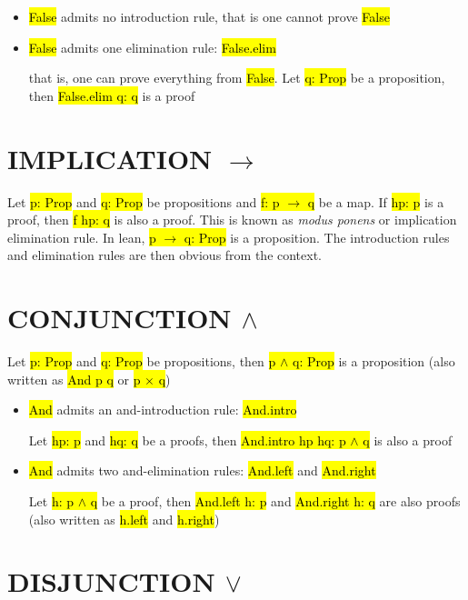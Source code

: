 \begin{itemize}
	\item \hl{False} admits no introduction rule, that is one cannot prove \hl{False}
	
	\item \hl{False} admits one elimination rule: \hl{False.elim}
	
	that is, one can prove everything from \hl{False}. Let \hl{q: Prop} be a proposition, then \hl{False.elim q: q} is a proof
\end{itemize}



\section{IMPLICATION $\to$}

Let \hl{p: Prop} and \hl{q: Prop} be propositions and \hl{f: p $\to$ q} be a map. If \hl{hp: p} is a proof, then \hl{f hp: q} is also a proof. This is known as \textit{modus ponens} or implication elimination rule. In lean, \hl{p $\to$ q: Prop} is a proposition. The introduction rules and elimination rules are then obvious from the context.

\section{CONJUNCTION $\land$}

Let \hl{p: Prop} and \hl{q: Prop} be propositions, then \hl{p $\land$ q: Prop} is a proposition (also written as \hl{And p q} or \hl{p $\times$ q})

\begin{itemize}
	\item \hl{And} admits an and-introduction rule: \hl{And.intro}
	
	Let \hl{hp: p} and \hl{hq: q} be a proofs, then \hl{And.intro hp hq: p $\land$ q} is also a proof
	
	\item \hl{And} admits two and-elimination rules: \hl{And.left} and \hl{And.right}
	
	Let \hl{h: p $\land$ q} be a proof, then \hl{And.left h: p} and \hl{And.right h: q} are also proofs (also written as \hl{h.left} and \hl{h.right})
	
	
\end{itemize}


\section{DISJUNCTION $\lor$}

